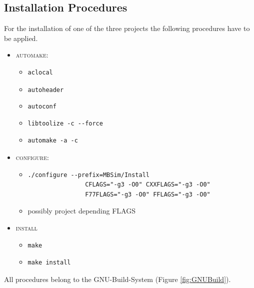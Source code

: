 \subsection{Installation Procedures}
For the installation of one of the three projects the following procedures have to be applied.
\begin{itemize}
	\item \textsc{automake}:
	\begin{itemize}
		\item[] \begin{verbatim}aclocal\end{verbatim}
		\item[] \texttt{autoheader}
		\item[] \texttt{autoconf}
		\item[] \begin{verbatim}libtoolize -c --force\end{verbatim}
		\item[] \begin{verbatim}automake -a -c\end{verbatim}
	\end{itemize}
	\item \textsc{configure}: 
	\begin{itemize}
		\item[] \begin{verbatim}./configure --prefix=MBSim/Install
				CFLAGS="-g3 -O0" CXXFLAGS="-g3 -O0"
				F77FLAGS="-g3 -O0" FFLAGS="-g3 -O0"
				\end{verbatim}
		\item[] possibly project depending FLAGS
	\end{itemize}
	\item \textsc{install}
	\begin{itemize}	
		\item \begin{verbatim}make\end{verbatim}
		\item \begin{verbatim}make install\end{verbatim}
	\end{itemize}
\end{itemize}
All procedures belong to the GNU-Build-System (Figure \ref{fig:GNUBuild}).\par
